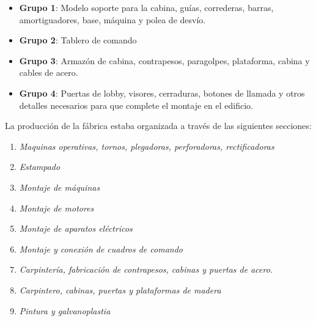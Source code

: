 \documentclass[a4paper,10pt]{article}
\begin{document}
\begin{itemize}
\item \textbf{Grupo 1}: Modelo soporte para la cabina, guías, correderas, barras, amortiguadores, base, máquina y polea de desvío.
\item \textbf{Grupo 2}: Tablero de comando
\item \textbf{Grupo 3}: Armazón de cabina, contrapesos, paragolpes, plataforma, cabina y cables de acero.
\item \textbf{Grupo 4}: Puertas de lobby, visores, cerraduras, botones de llamada y otros detalles necesarios para que complete el montaje en el edificio.
\end{itemize}

La producción de la fábrica estaba organizada a través de las siguientes secciones:

\begin{enumerate}
\item \textit{Maquinas operativas, tornos, plegadoras, perforadoras, rectificadoras}
\item \textit{Estampado}
\item \textit{Montaje de máquinas}
\item \textit{Montaje de motores}
\item \textit{Montaje de aparatos eléctricos}
\item \textit{Montaje y conexión de cuadros de comando}
\item \textit{Carpintería, fabricación de contrapesos, cabinas y puertas de acero.}
\item \textit{Carpintero, cabinas, puertas y plataformas de madera}
\item \textit{Pintura y galvanoplastia}
\end{enumerate}
\end{document}
